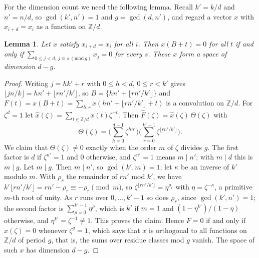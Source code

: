 \documentclass[11pt]{article}
\newtheorem{lemma}[theorem]{Lemma}
\theoremstyle{remark}
\newcommand{\Z}{\mathbb{Z}}
\begin{document}
For the dimension count we need the following lemma. Recall $k'=k/d$ and $n'=n/d$, so $\gcd(k',n')=1$ and $g=\gcd(d,n')$, and regard a vector $x$ with $x_{i+d}=x_i$ as a function on $\Z/d$.

\begin{lemma}\label{lem:fourier}
Let $x$ satisfy $x_{i+d}=x_i$ for all $i$. Then $x(B+t)=0$ for all $t$ if and only if $\sum_{0\le j<d,\ j\equiv s\ (\mathrm{mod}\ g)}x_j=0$ for every $s$. These $x$ form a space of dimension $d-g$.
\end{lemma}

\begin{proof}
Writing $j=hk'+r$ with $0\le h<d$, $0\le r<k'$ gives $\lfloor jn/k\rfloor=hn'+\lfloor rn'/k'\rfloor$, so $B=\{hn'+\lfloor rn'/k'\rfloor\}$ and $F(t)=x(B+t)=\sum_{h,r}x(hn'+\lfloor rn'/k'\rfloor+t)$ is a convolution on $\Z/d$. For $\zeta^d=1$ let $\hat x(\zeta)=\sum_{t\in\Z/d}x(t)\zeta^{-t}$. Then $\hat F(\zeta)=\hat x(\zeta)\,\Theta(\zeta)$ with
\[
\Theta(\zeta)=\Big(\sum_{h=0}^{d-1}\zeta^{hn'}\Big)\Big(\sum_{r=0}^{k'-1}\zeta^{\lfloor rn'/k'\rfloor}\Big).
\]
We claim that $\Theta(\zeta)\ne0$ exactly when the order $m$ of $\zeta$ divides $g$. The first factor is $d$ if $\zeta^{n'}=1$ and $0$ otherwise, and $\zeta^{n'}=1$ means $m\mid n'$; with $m\mid d$ this is $m\mid g$. Let $m\mid g$. Then $m\mid n'$, so $\gcd(k',m)=1$; let $\kappa$ be an inverse of $k'$ modulo $m$. With $\rho_r$ the remainder of $rn'$ mod $k'$, we have $k'\lfloor rn'/k'\rfloor=rn'-\rho_r\equiv-\rho_r\pmod m$, so $\zeta^{\lfloor rn'/k'\rfloor}=\eta^{\rho_r}$ with $\eta=\zeta^{-\kappa}$, a primitive $m$-th root of unity. As $r$ runs over $0,\dots,k'-1$ so does $\rho_r$, since $\gcd(k',n')=1$; the second factor is $\sum_{\rho=0}^{k'-1}\eta^\rho$, which is $k'$ if $m=1$ and $(1-\eta^{k'})/(1-\eta)$ otherwise, and $\eta^{k'}=\zeta^{-1}\ne1$. This proves the claim. Hence $F=0$ if and only if $\hat x(\zeta)=0$ whenever $\zeta^g=1$, which says that $x$ is orthogonal to all functions on $\Z/d$ of period $g$, that is, the sums over residue classes mod $g$ vanish. The space of such $x$ has dimension $d-g$.
\end{proof}
\end{document}
